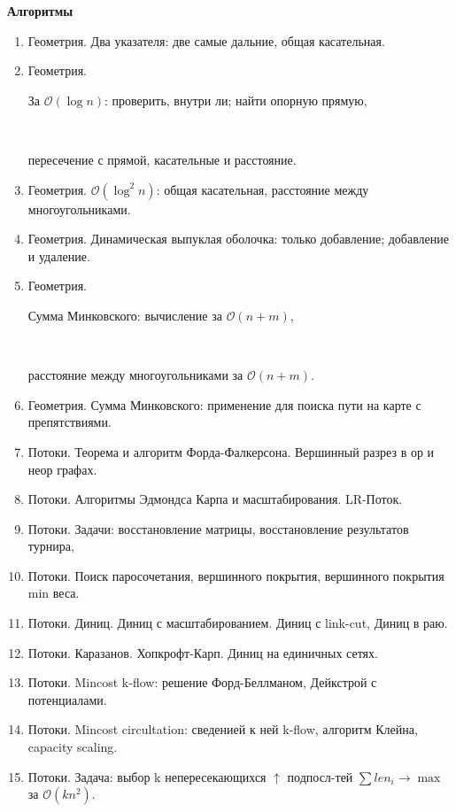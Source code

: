 \documentclass[11pt]{article}
\def\O{\mathcal{O}}      %
\newcounter{myenumi}
\newenvironment{MyList}{
  \begin{enumerate}[1.]
  \setlength{\parskip}{0pt}
  \setlength{\itemsep}{2pt}
  \setcounter{enumi}{\arabic{myenumi}}
}{
  \setcounter{myenumi}{\arabic{enumi}}
  \end{enumerate}
}
\def\Header#1{
  \vspace*{0.1em}
  {\color{blue} \large \bf #1}
  \vspace*{0.2em}
}
\begin{document}
\Header{Алгоритмы}

\begin{MyList}

\item Геометрия. Два указателя: две самые дальние, общая касательная.
\item \parbox{2cm}{Геометрия.} За $\O(\log n)$: проверить, внутри ли; найти опорную прямую, \\
      \parbox{2cm}{\ } пересечение с прямой, касательные и расстояние.
\item Геометрия. $\O(\log^2n)$: общая касательная, расстояние между многоугольниками.
\item Геометрия. Динамическая выпуклая оболочка: только добавление; добавление и удаление.
\item \parbox{2cm}{Геометрия.} Сумма Минковского: вычисление за $\O(n{+}m)$, \\
      \parbox{2cm}{\ } расстояние между многоугольниками за $\O(n{+}m)$.
\item Геометрия. Сумма Минковского: применение для поиска пути на карте с препятствиями.

\item Потоки. Теорема и алгоритм Форда-Фалкерсона. Вершинный разрез в ор и неор графах.
\item Потоки. Алгоритмы Эдмондса Карпа и масштабирования. LR-Поток.
\item Потоки. Задачи: восстановление матрицы, восстановление результатов турнира, 
\item Потоки. Поиск паросочетания, вершинного покрытия, вершинного покрытия min веса. 
\item Потоки. Диниц. Диниц с масштабированием. Диниц с link-cut, Диниц в раю.
\item Потоки. Каразанов. Хопкрофт-Карп. Диниц на единичных сетях.
\item Потоки. Mincost k-flow: решение Форд-Беллманом, Дейкстрой с потенциалами.
\item Потоки. Mincost circultation: сведенией к ней k-flow, алгоритм Клейна, capacity scaling.
\item Потоки. Задача: выбор k непересекающихся $\uparrow$ подпосл-тей $\sum len_i \to \max$ за $\O(kn^2)$.

\pagebreak
\vspace*{2em}


\end{MyList}
\end{document}
